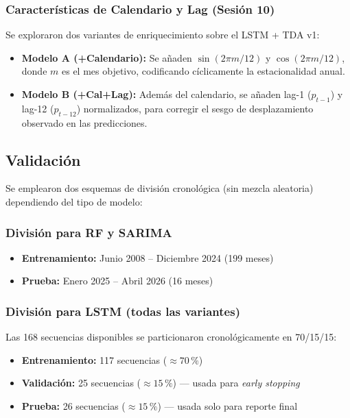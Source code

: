 \documentclass[12pt, a4paper]{article}
\begin{document}
\subsubsection{Características de Calendario y Lag (Sesión 10)}
Se exploraron dos variantes de enriquecimiento sobre el LSTM + TDA v1:
\begin{itemize}
  \item \textbf{Modelo A (+Calendario):} Se añaden $\sin(2\pi m/12)$ y $\cos(2\pi m/12)$,
        donde $m$ es el mes objetivo, codificando cíclicamente la estacionalidad anual.
  \item \textbf{Modelo B (+Cal+Lag):} Además del calendario, se añaden lag-1 ($p_{t-1}$) y
        lag-12 ($p_{t-12}$) normalizados, para corregir el sesgo de desplazamiento observado en las
        predicciones.
\end{itemize}

\subsection{Validación}

Se emplearon dos esquemas de división cronológica (sin mezcla aleatoria) dependiendo del tipo de
modelo:

\subsubsection{División para RF y SARIMA}
\begin{itemize}
  \item \textbf{Entrenamiento:} Junio 2008 – Diciembre 2024 (199 meses)
  \item \textbf{Prueba:} Enero 2025 – Abril 2026 (16 meses)
\end{itemize}

\subsubsection{División para LSTM (todas las variantes)}
Las 168 secuencias disponibles se particionaron cronológicamente en 70/15/15:
\begin{itemize}
  \item \textbf{Entrenamiento:} 117 secuencias ($\approx 70\,\%$)
  \item \textbf{Validación:} 25 secuencias ($\approx 15\,\%$) — usada para \textit{early stopping}
  \item \textbf{Prueba:} 26 secuencias ($\approx 15\,\%$) — usada solo para reporte final
\end{itemize}
\end{document}
